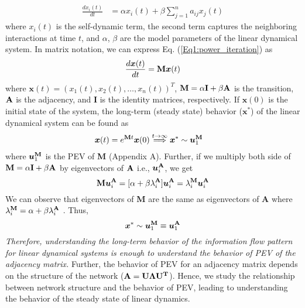 \documentclass[aps, prd, showpacs, floatfix, superscriptaddress, twocolumn, nofootinbib, preprintnumbers, longbibliography]{revtex4-2}
\begin{document}
\begin{equation} 
\begin{split}
\frac{dx_i(t)}{dt}&= \alpha x_i(t)+\beta \sum_{j=1}^{n}a_{ij}x_j(t)
\end{split}
\label{Eq1:power_iteration}
\end{equation}
where $x_i(t)$ is the self-dynamic term, the second term captures the neighboring interactions at time $t$, and $\alpha$, $\beta$ are the model parameters of the linear dynamical system. In matrix notation, we can express Eq. (\ref{Eq1:power_iteration}) as 
\begin{equation}
\frac{d\bm{x}(t)}{dt} =  {\bf M} \bm{x}(t)
\label{Eq2:power_iteration}
\end{equation}
where $\bm{x}(t)=(x_1(t),x_2(t),\ldots,x_n(t))^{T}$, ${\bf M}=\alpha {\bf I}+\beta {\bf A}$ is the transition, ${\bf A}$ is the adjacency, and {\bf I} is the identity matrices, respectively. If $\bm{x}(0)$ is the initial state of the system, the long-term (steady state) behavior ($\bm{x}^{*}$) of the linear dynamical system can be found as 
\begin{equation}
\begin{split}
\bm{x}(t) &= e^{{\bf M}t}\bm{x}(0)\overset{t\rightarrow \infty}{\Longrightarrow} \bm{x}^{*} \sim  \bm{u}_1^{\bf M}
\end{split}
\end{equation}
where $\bm{u}_1^{\bf M}$ is the PEV of {\bf M} (Appendix A). Further, if we multiply both side of ${\bf M} = \alpha {\bf I}+\beta {\bf A}$ by eigenvectors of ${\bf A}$ i.e., $\bm{u}_i^{\bf A}$, we get 
\begin{equation}\nonumber
{\bf M}\bm{u}_i^{\bf A} =[\alpha+\beta\lambda_i^{\bf A}]\bm{u}_i^{\bf A} =\lambda_i^{\bf M}\bm{u}_i^{\bf A}
\end{equation}
We can observe that eigenvectors of {\bf M} are the same as eigenvectors of {\bf A} where $\lambda_i^{\bf M} = \alpha + \beta \lambda_i^{\bf A}$ \cite{loc2020spectra}. Thus,
\begin{equation}\nonumber
\bm{x}^{*} \sim \bm{u}_1^{\bf M} \equiv \bm{u}_1^{\bf A} 
\end{equation}
{\em Therefore, understanding the long-term behavior of the information flow pattern for linear dynamical systems is enough to understand the behavior of PEV of the adjacency matrix.} Further, the behavior of PEV for an adjacency matrix depends on the structure of the network (${\bf A=U \Lambda U^T}$). Hence, we study the relationship between network structure and the behavior of PEV, leading to understanding the behavior of the steady state of linear dynamics.
\end{document}

